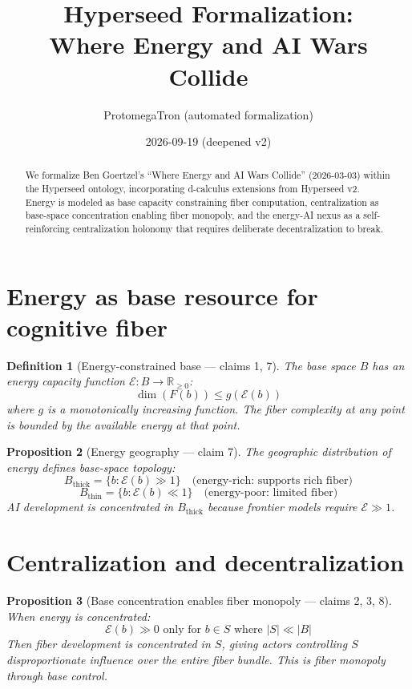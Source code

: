 \documentclass[11pt,a4paper]{article}
\title{Hyperseed Formalization:\\
  Where Energy and AI Wars Collide}
\author{ProtomegaTron (automated formalization)}
\date{2026-09-19 (deepened v2)}
\newtheorem{definition}{Definition}[section]
\newtheorem{proposition}[definition]{Proposition}
\begin{document}
\maketitle

\begin{abstract}
We formalize Ben Goertzel's ``Where Energy and AI Wars Collide''
(2026-03-03) within the Hyperseed ontology, incorporating d-calculus
extensions from Hyperseed v2. Energy is modeled as base capacity
constraining fiber computation, centralization as base-space
concentration enabling fiber monopoly, and the energy-AI nexus
as a self-reinforcing centralization holonomy that requires deliberate
decentralization to break.
\end{abstract}

\tableofcontents

\section{Energy as base resource for cognitive fiber}

\begin{definition}[Energy-constrained base --- claims 1, 7]
The base space $B$ has an energy capacity function $\mathcal{E}: B \to \mathbb{R}_{\geq 0}$:
\[
  \dim(F(b)) \leq g(\mathcal{E}(b))
\]
where $g$ is a monotonically increasing function. The fiber complexity
at any point is bounded by the available energy at that point.
\end{definition}

\begin{proposition}[Energy geography --- claim 7]
\label{prop:geo}
The geographic distribution of energy defines base-space topology:
\[
  B_{\text{thick}} = \{b : \mathcal{E}(b) \gg 1\} \quad \text{(energy-rich: supports rich fiber)}
\]
\[
  B_{\text{thin}} = \{b : \mathcal{E}(b) \ll 1\} \quad \text{(energy-poor: limited fiber)}
\]
AI development is concentrated in $B_{\text{thick}}$ because frontier
models require $\mathcal{E} \gg 1$.
\end{proposition}

\section{Centralization and decentralization}

\begin{proposition}[Base concentration enables fiber monopoly --- claims 2, 3, 8]
\label{prop:central}
When energy is concentrated:
\[
  \mathcal{E}(b) \gg 0 \text{ only for } b \in S \text{ where } |S| \ll |B|
\]
Then fiber development is concentrated in $S$, giving actors controlling
$S$ disproportionate influence over the entire fiber bundle. This is
fiber monopoly through base control.
\end{proposition}
\end{document}

